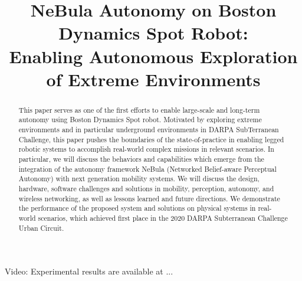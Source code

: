 \documentclass[a4paper, 10pt, conference]{ieeeconf}      %
\title{\LARGE \bf
NeBula Autonomy on Boston Dynamics Spot Robot: \\
Enabling Autonomous Exploration of Extreme Environments%
}
\author{%
}
\newcommand{\ph}[1]{{\textbf{#1}:}} %
\newcommand{\inst}[1]{{\color{orange} #1 }} %
\begin{document}
\maketitle
\thispagestyle{empty}
\pagestyle{empty}


\begin{abstract}
This paper serves as one of the first efforts to enable large-scale and long-term autonomy using Boston Dynamics Spot robot. Motivated by exploring extreme environments and in particular underground environments in DARPA SubTerranean Challenge, this paper pushes the boundaries of the state-of-practice in enabling legged robotic systems to accomplish real-world complex missions in relevant scenarios. In particular, we will discuss the behaviors and capabilities which emerge from the integration of the autonomy framework NeBula (Networked Belief-aware Perceptual Autonomy) with next generation mobility systems. We will discuss the design, hardware, software challenges and solutions in mobility, perception, autonomy, and wireless networking, as well as lessons learned and future directions. We demonstrate the performance of the proposed system and solutions on physical systems in real-world scenarios, which achieved first place in the 2020 DARPA Subterranean Challenge Urban Circuit.
\end{abstract}
Video: Experimental results are available at ... 



\end{document}
